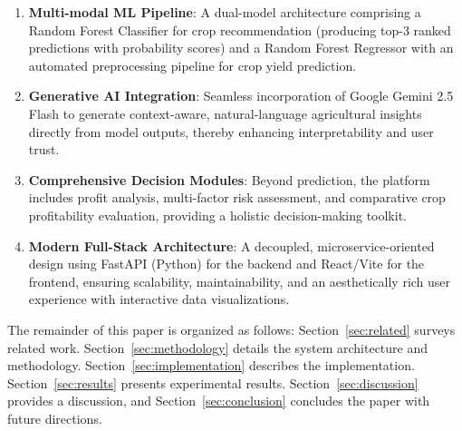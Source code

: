 \begin{enumerate}
    \item \textbf{Multi-modal ML Pipeline}: A dual-model architecture comprising a Random Forest Classifier for crop recommendation (producing top-3 ranked predictions with probability scores) and a Random Forest Regressor with an automated preprocessing pipeline for crop yield prediction.
    \item \textbf{Generative AI Integration}: Seamless incorporation of Google Gemini 2.5 Flash to generate context-aware, natural-language agricultural insights directly from model outputs, thereby enhancing interpretability and user trust.
    \item \textbf{Comprehensive Decision Modules}: Beyond prediction, the platform includes profit analysis, multi-factor risk assessment, and comparative crop profitability evaluation, providing a holistic decision-making toolkit.
    \item \textbf{Modern Full-Stack Architecture}: A decoupled, microservice-oriented design using FastAPI (Python) for the backend and React/Vite for the frontend, ensuring scalability, maintainability, and an aesthetically rich user experience with interactive data visualizations.
\end{enumerate}

The remainder of this paper is organized as follows: Section~\ref{sec:related} surveys related work. Section~\ref{sec:methodology} details the system architecture and methodology. Section~\ref{sec:implementation} describes the implementation. Section~\ref{sec:results} presents experimental results. Section~\ref{sec:discussion} provides a discussion, and Section~\ref{sec:conclusion} concludes the paper with future directions.
